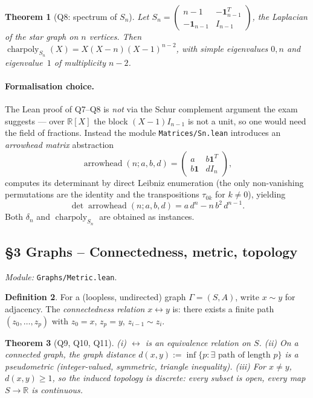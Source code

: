 \documentclass[11pt,a4paper]{article}
\newcommand{\lmod}[1]{\texttt{\small #1}}
\newcommand{\R}{\mathbb{R}}
\newcommand{\charpoly}{\operatorname{charpoly}}
\newcommand{\Adj}{\sim}
\theoremstyle{plain}
\newtheorem{theorem}{Theorem}[section]
\theoremstyle{definition}
\newtheorem{definition}[theorem]{Definition}
\begin{document}
\begin{theorem}[Q8: spectrum of $S_n$]
Let $S_n = \begin{pmatrix} n-1 & -\mathbf 1_{n-1}^T \\
-\mathbf 1_{n-1} & I_{n-1} \end{pmatrix}$, the Laplacian of the star
graph on $n$ vertices. Then
$\charpoly_{S_n}(X) = X (X - n)(X - 1)^{n-2}$, with simple eigenvalues
$0, n$ and eigenvalue~$1$ of multiplicity $n-2$.
\end{theorem}

\paragraph{Formalisation choice.}
The Lean proof of Q7--Q8 is \emph{not} via the Schur complement argument
the exam suggests --- over $\R[X]$ the block $(X-1) I_{n-1}$ is not a
unit, so one would need the field of fractions. Instead the module
\lmod{Matrices/Sn.lean} introduces an \emph{arrowhead matrix}
abstraction
\[
\operatorname{arrowhead}(n; a, b, d)
= \begin{pmatrix} a & b\mathbf 1^T \\ b\mathbf 1 & d I_n \end{pmatrix},
\]
computes its determinant by direct Leibniz enumeration (the only
non-vanishing permutations are the identity and the transpositions
$\tau_{0k}$ for $k \ne 0$), yielding
\[
\det \operatorname{arrowhead}(n; a, b, d) = a\, d^n - n\, b^2\, d^{n-1}.
\]
Both $\delta_n$ and $\charpoly_{S_n}$ are obtained as instances.

\subsection{\S3 Graphs -- Connectedness, metric, topology}
\emph{Module:} \lmod{Graphs/Metric.lean}.

\begin{definition}
For a (loopless, undirected) graph $\Gamma = (S, A)$, write
$x \Adj y$ for adjacency. The \emph{connectedness relation}
$x \leftrightarrow y$ is: there exists a finite path
$(z_0, \ldots, z_p)$ with $z_0 = x$, $z_p = y$, $z_{i-1} \Adj z_i$.
\end{definition}

\begin{theorem}[Q9, Q10, Q11]
(i) $\leftrightarrow$ is an equivalence relation on $S$.
(ii) On a connected graph, the \emph{graph distance}
$d(x,y) := \inf\{p : \exists\text{ path of length } p\}$ is a
pseudometric (integer-valued, symmetric, triangle inequality).
(iii) For $x \ne y$, $d(x,y) \geq 1$, so the induced topology is
discrete: every subset is open, every map $S \to \R$ is continuous.
\end{theorem}
\end{document}
